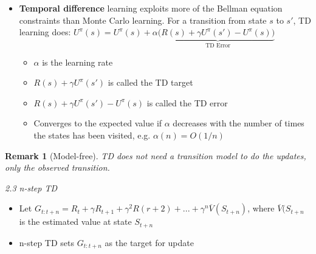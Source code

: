 \documentclass[12pt]{article}
\newtheorem*{remark}{Remark}
\begin{document}
\begin{itemize}
\begin{itemize}
 \end{itemize}
\item \textbf{Temporal difference} learning exploits more of the Bellman equation constraints than Monte Carlo learning. For a transition from state $s$ to $s'$, TD learning does:
 $U^\pi (s) = U^\pi (s) + \alpha( \underbrace{R(s) + \gamma U^\pi(s') - U^\pi(s))}_{\text{TD Error}}$ 
\begin{itemize}
\item $\alpha$ is the learning rate
\item $R(s) + \gamma U^\pi(s')$ is called the TD target
\item $R(s) + \gamma U^\pi(s') - U^\pi(s)$ is called the TD error
\item Converges to the expected value if $\alpha$ decreases with the number of times the states has been visited, e.g. $\alpha (n) = O(1/n)$
\end{itemize}

\end{itemize}


\begin{remark}[Model-free]
TD does not need a transition model to do the updates, only the observed transition.
\end{remark}

\noindent
\textsl{2.3 n-step TD}
\begin{itemize}
\item Let $G_{t:t+n} = R_t + \gamma R_{t+1} + \gamma^2R(r+2) + ... + \gamma ^n \overline{V}(S_{t+n})$, where $\overline{V}(S_{t+n}$ is the estimated value at state $S_{t+n}$
\item n-step TD sets $G_{t:t+n}$ as the target for update
\end{itemize}
\end{document}
